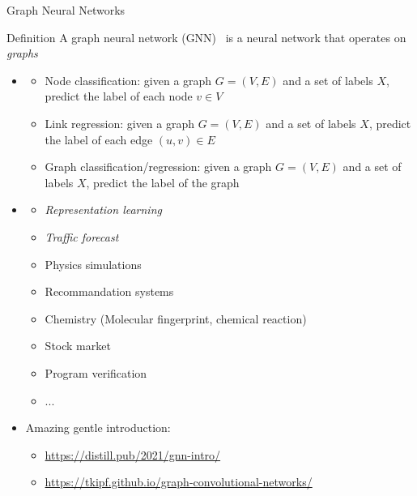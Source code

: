 \documentclass[presentation, 9pt]{beamer}\mode<presentation>{\usetheme{AMSBolognaFC}}
\begin{document}
\begin{frame}{Graph Neural Networks}
\begin{alertblock}{Definition}
	A graph neural network (GNN)~ is a neural network that operates on \textit{graphs}
\end{alertblock}
\begin{itemize}
	\item {}
	\begin{itemize}
		\item Node classification: given a graph $G=(V,E)$ and a set of labels $X$, predict the label of each node $v \in V$
		\item Link regression: given a graph $G=(V,E)$ and a set of labels $X$, predict the label of each edge $(u,v) \in E$
		\item Graph classification/regression: given a graph $G=(V,E)$ and a set of labels $X$, predict the label of the graph
	\end{itemize}
	\item {}
	\begin{itemize}
		\item \emph{Representation learning}
		\item \emph{Traffic forecast}~
		\item Physics simulations~
		\item Recommandation systems~
		\item Chemistry (Molecular fingerprint, chemical reaction)~
		\item Stock market~
		\item Program verification~
		\item ...
	\end{itemize}
	\item Amazing gentle introduction: 
	\begin{itemize}
		\item \url{https://distill.pub/2021/gnn-intro/}
		\item \url{https://tkipf.github.io/graph-convolutional-networks/}
	\end{itemize}
\end{itemize}
\end{frame}
\end{document}
